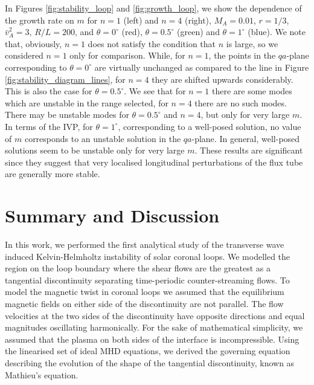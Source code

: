 In Figures \ref{fig:stability_loop} and \ref{fig:growth_loop}, we show the dependence of the growth rate on $m$ for $n = 1$ (left) and $n=4$ (right), $M_A = 0.01$, $r = 1/3$, $\bar{v}_A^2 = 3$, $R/L = 200$, and $\theta = 0^\circ$ (red), $\theta = 0.5^\circ$ (green) and $\theta = 1^\circ$ (blue).
We note that, obviously, $n = 1$ does not satisfy the condition that $n$ is large, so we considered $n = 1$ only for comparison.
While, for $n=1$, the points in the $qa$-plane corresponding to $\theta = 0^\circ$ are virtually unchanged as compared to the line in Figure \ref{fig:stability_diagram_lines}, for $n=4$ they are shifted upwards considerably.
This is also the case for $\theta = 0.5^\circ$.
We see that for $n=1$ there are some modes which are unstable in the range selected, for $n=4$ there are no such modes.
There may be unstable modes for $\theta = 0.5^\circ$ and $n=4$, but only for very large $m$.
In terms of the IVP, for $\theta = 1^\circ$, corresponding to a well-posed solution, no value of $m$ corresponds to an unstable solution in the $qa$-plane.
In general, well-posed solutions seem to be unstable only for very large $m$.
These results are significant since they suggest that very localised longitudinal perturbations of the flux tube are generally more stable.

\section{Summary and Discussion}
\label{sec:sum}

In this work, we performed the first analytical study of the transverse wave induced Kelvin-Helmholtz instability of solar coronal loops. We modelled the region on the loop boundary where the shear flows are the greatest as a tangential discontinuity separating time-periodic counter-streaming flows.
To model the magnetic twist in coronal loops we assumed that the equilibrium magnetic fields on either side of the discontinuity are not parallel.
The flow velocities at the two sides of the discontinuity have opposite directions and equal magnitudes oscillating harmonically.
For the sake of mathematical simplicity, we assumed that the plasma on both sides of the interface is incompressible.
Using the linearised set of ideal MHD equations, we derived the governing equation describing the evolution of the shape of the tangential discontinuity, known as Mathieu's equation.

